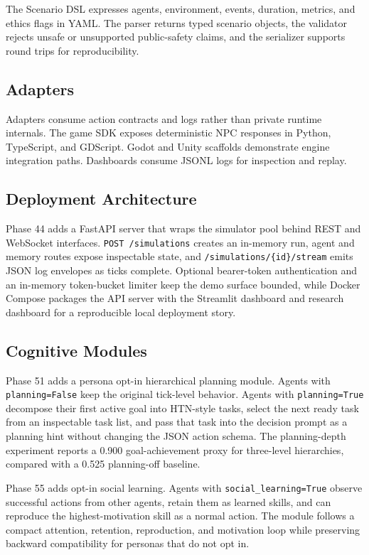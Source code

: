The Scenario DSL expresses agents, environment, events, duration, metrics, and ethics flags in YAML. The parser returns typed scenario objects, the validator rejects unsafe or unsupported public-safety claims, and the serializer supports round trips for reproducibility.



\subsection{Adapters}

Adapters consume action contracts and logs rather than private runtime internals. The game SDK exposes deterministic NPC responses in Python, TypeScript, and GDScript. Godot and Unity scaffolds demonstrate engine integration paths. Dashboards consume JSONL logs for inspection and replay.



\subsection{Deployment Architecture}

Phase 44 adds a FastAPI server that wraps the simulator pool behind REST and WebSocket interfaces. \texttt{POST /simulations} creates an in-memory run, agent and memory routes expose inspectable state, and \texttt{/simulations/\{id\}/stream} emits JSON log envelopes as ticks complete. Optional bearer-token authentication and an in-memory token-bucket limiter keep the demo surface bounded, while Docker Compose packages the API server with the Streamlit dashboard and research dashboard for a reproducible local deployment story.

\subsection{Cognitive Modules}

Phase 51 adds a persona opt-in hierarchical planning module. Agents with \texttt{planning=False} keep the original tick-level behavior. Agents with \texttt{planning=True} decompose their first active goal into HTN-style tasks, select the next ready task from an inspectable task list, and pass that task into the decision prompt as a planning hint without changing the JSON action schema. The planning-depth experiment reports a 0.900 goal-achievement proxy for three-level hierarchies, compared with a 0.525 planning-off baseline.

Phase 55 adds opt-in social learning. Agents with \texttt{social\_learning=True} observe successful actions from other agents, retain them as learned skills, and can reproduce the highest-motivation skill as a normal action. The module follows a compact attention, retention, reproduction, and motivation loop while preserving backward compatibility for personas that do not opt in.
